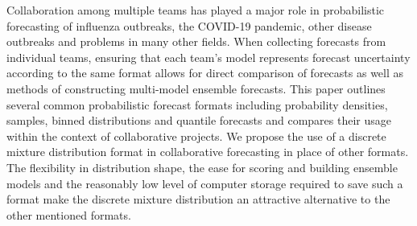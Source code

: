 
Collaboration among multiple teams has played a major role in probabilistic
forecasting of influenza outbreaks, the COVID-19 pandemic, other disease
outbreaks and problems in many other fields. When collecting forecasts from 
individual teams, ensuring that each team's model represents forecast
uncertainty according to the same format allows for direct comparison of 
forecasts as well as methods of constructing multi-model ensemble forecasts.
This paper outlines several common probabilistic forecast formats including
probability densities, samples, binned distributions and  quantile 
forecasts and compares
their usage within the context of collaborative projects. We propose the use of
a discrete mixture distribution format in collaborative forecasting in place of
other formats. The flexibility in distribution shape, the ease for scoring and 
building ensemble models and the reasonably low level of computer storage 
required to save such a format make the discrete mixture distribution an 
attractive alternative to the other mentioned formats.

